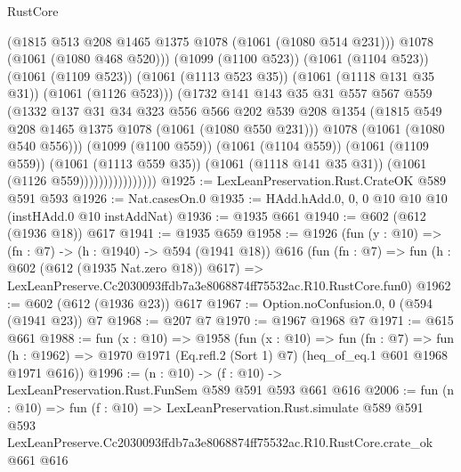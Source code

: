 \begin{lexlean}{RustCore}
\begin{coremodule}
                                  (@1815 @513 @208 @1465 @1375 @1078 (@1061 (@1080 @514 @231)))
                                  @1078
                                  (@1061 (@1080 @468 @520)))
                                (@1099 (@1100 @523))
                                (@1061 (@1104 @523))
                                (@1061 (@1109 @523))
                                (@1061 (@1113 @523 @35))
                                (@1061 (@1118 @131 @35 @31))
                                (@1061 (@1126 @523)))
                              (@1732
                                @141
                                @143
                                @35
                                @31
                                @557
                                @567
                                @559
                                (@1332
                                  @137
                                  @31
                                  @34
                                  @323
                                  @556
                                  @566
                                  @202
                                  @539
                                  @208
                                  @1354
                                  (@1815 @549 @208 @1465 @1375 @1078 (@1061 (@1080 @550 @231)))
                                  @1078
                                  (@1061 (@1080 @540 @556)))
                                (@1099 (@1100 @559))
                                (@1061 (@1104 @559))
                                (@1061 (@1109 @559))
                                (@1061 (@1113 @559 @35))
                                (@1061 (@1118 @141 @35 @31))
                                (@1061 (@1126 @559))))))))))))))))
@1925 := LexLeanPreservation.Rust.CrateOK @589 @591 @593
@1926 := Nat.casesOn.{0}
@1935 := HAdd.hAdd.{0, 0, 0} @10 @10 @10 (instHAdd.{0} @10 instAddNat)
@1936 := @1935 @661
@1940 := @602 (@612 (@1936 @18)) @617
@1941 := @1935 @659
@1958 := @1926
    (fun (y : @10) => (fn : @7) -> (h : @1940) -> @594 (@1941 @18))
    @616
    (fun (fn : @7) =>
    fun (h : @602 (@612 (@1935 Nat.zero @18)) @617) =>
    LexLeanPreserve.Cc2030093ffdb7a3e8068874ff75532ac.R10.RustCore.fun0)
@1962 := @602 (@612 (@1936 @23)) @617
@1967 := Option.noConfusion.{0, 0} (@594 (@1941 @23)) @7
@1968 := @207 @7
@1970 := @1967 @1968 @7
@1971 := @615 @661
@1988 := fun (x : @10) =>
  @1958
    (fun (x : @10) =>
    fun (fn : @7) =>
    fun (h : @1962) => @1970 @1971 (Eq.refl.{2} (Sort 1) @7) (heq_of_eq.{1} @601 @1968 @1971 @616))
@1996 := (n : @10) -> (f : @10) -> LexLeanPreservation.Rust.FunSem @589 @591 @593 @661 @616
@2006 := fun (n : @10) =>
  fun (f : @10) =>
  LexLeanPreservation.Rust.simulate
    @589
    @591
    @593
    LexLeanPreserve.Cc2030093ffdb7a3e8068874ff75532ac.R10.RustCore.crate_ok
    @661
    @616
\end{coremodule}
\end{lexlean}
